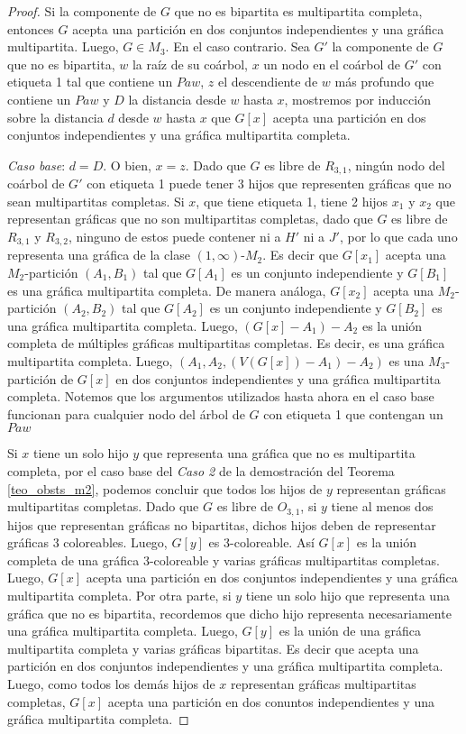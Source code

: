 \begin{proof}
Si la componente de $G$ que no es bipartita es multipartita completa, entonces $G$ acepta una partición en dos conjuntos independientes y una gráfica multipartita. Luego, $G\in M_3$. En el caso contrario. Sea $G'$ la componente de $G$ que no es bipartita, $w$ la raíz de su coárbol, $x$ un nodo en el coárbol de $G'$ con etiqueta 1 tal que contiene un $Paw$, $z$ el descendiente de $w$ más profundo que contiene un $Paw$ y $D$ la distancia desde $w$ hasta $x$, mostremos por inducción sobre la distancia $d$ desde $w$ hasta $x$ que $G[x]$ acepta una partición en dos conjuntos independientes y una gráfica multipartita completa.

\emph{Caso base}: $d=D$. O bien, $x=z$.
Dado que $G$ es libre de $R_{3,1}$, ningún nodo del coárbol de $G'$ con etiqueta 1 puede tener 3 hijos que representen gráficas que no sean multipartitas completas. Si $x$, que tiene etiqueta 1, tiene 2 hijos $x_1$ y $x_2$ que representan gráficas que no son multipartitas completas, dado que $G$ es libre de $R_{3,1}$ y $R_{3,2}$, ninguno de estos puede contener ni a $H'$ ni a $J'$, por lo que cada uno representa una gráfica de la clase $(1,\infty)$-$M_2$. Es decir que $G[x_1]$ acepta una $M_2$-partición $(A_1,B_1)$ tal que $G[A_1]$ es un conjunto independiente y $G[B_1]$ es una gráfica multipartita completa. De manera análoga, $G[x_2]$ acepta una $M_2$-partición $(A_2,B_2)$ tal que $G[A_2]$ es un conjunto independiente y $G[B_2]$ es una gráfica multipartita completa. Luego, $(G[x]-A_1)-A_2$ es la unión completa de múltiples gráficas multipartitas completas. Es decir, es una gráfica multipartita completa. Luego, $(A_1,A_2,(V(G[x])-A_1)-A_2)$ es una $M_3$-partición de $G[x]$ en dos conjuntos independientes y una gráfica multipartita completa. Notemos que los argumentos utilizados hasta ahora en el caso base funcionan para cualquier nodo del árbol de $G$ con etiqueta 1 que contengan un $Paw$

Si $x$ tiene un solo hijo $y$ que representa una gráfica que no es multipartita completa, por el caso base del \emph{Caso 2} de la demostración del Teorema \ref{teo_obsts_m2}, podemos concluir que todos los hijos de $y$ representan gráficas multipartitas completas. Dado que $G$ es libre de $O_{3,1}$, si $y$ tiene al menos dos hijos que representan gráficas no bipartitas, dichos hijos deben de representar gráficas 3 coloreables. Luego, $G[y]$ es 3-coloreable. Así $G[x]$ es la unión completa de una gráfica 3-coloreable y varias gráficas multipartitas completas. Luego, $G[x]$ acepta una partición en dos conjuntos independientes y una gráfica multipartita completa. Por otra parte, si $y$ tiene un solo hijo que representa una gráfica que no es bipartita, recordemos que dicho hijo representa necesariamente una gráfica multipartita completa. Luego, $G[y]$ es la unión de una gráfica multipartita completa y varias gráficas bipartitas. Es decir que acepta una partición en dos conjuntos independientes y una gráfica multipartita completa. Luego, como todos los demás hijos de $x$ representan gráficas multipartitas completas, $G[x]$ acepta una partición en dos conuntos independientes y una gráfica multipartita completa.


\end{proof}
